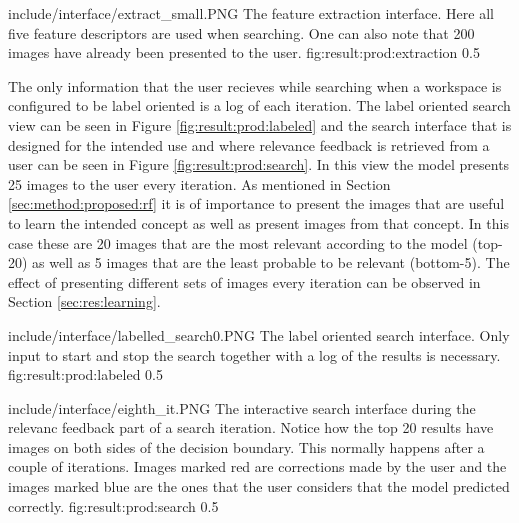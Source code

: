 \singlefigurenear
{include/interface/extract_small.PNG}
{The feature extraction interface. Here all five feature descriptors are used when searching. One can also note that 200 images have already been presented to the user.}
{fig:result:prod:extraction}
{0.5}

The only information that the user recieves while searching when a workspace is configured to be label oriented is a log of each iteration. The label oriented search view can be seen in Figure \ref{fig:result:prod:labeled} and the search interface that is designed for the intended use and where relevance feedback is retrieved from a user can be seen in Figure \ref{fig:result:prod:search}. In this view the model presents 25 images to the user every iteration. As mentioned in Section \ref{sec:method:proposed:rf} it is of importance to present the images that are useful to learn the intended concept as well as present images from that concept. In this case these are 20 images that are the most relevant according to the model (top-20) as well as 5 images that are the least probable to be relevant (bottom-5). The effect of presenting different sets of images every iteration can be observed in Section \ref{sec:res:learning}.

\singlefigurenear
{include/interface/labelled_search0.PNG}
{The label oriented search interface. Only input to start and stop the search together with a log of the results is necessary.}
{fig:result:prod:labeled}
{0.5}

\singlefigurenear
{include/interface/eighth_it.PNG}
{The interactive search interface during the relevanc feedback part of a search iteration. Notice how the top 20 results have images on both sides of the decision boundary. This normally happens after a couple of iterations. Images marked red are corrections made by the user and the images marked blue are the ones that the user considers that the model predicted correctly.}
{fig:result:prod:search}
{0.5}


